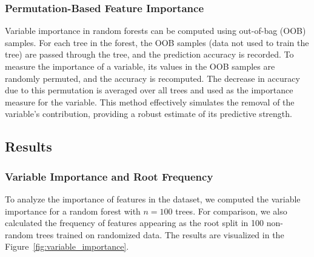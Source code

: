 \documentclass[fleqn,moreauthors,10pt]{ds_report}
\begin{document}
\subsubsection*{Permutation-Based Feature Importance}

Variable importance in random forests can be computed using out-of-bag (OOB) samples. For each tree in the forest, the OOB samples (data not used to train the tree) are passed through the tree, and the prediction accuracy is recorded. To measure the importance of a variable, its values in the OOB samples are randomly permuted, and the accuracy is recomputed. The decrease in accuracy due to this permutation is averaged over all trees and used as the importance measure for the variable. This method effectively simulates the removal of the variable's contribution, providing a robust estimate of its predictive strength\cite{ESL}.

\subsection*{Results}


\subsubsection*{Variable Importance and Root Frequency}

To analyze the importance of features in the dataset, we computed the variable importance for a random forest with \( n = 100 \) trees. For comparison, we also calculated the frequency of features appearing as the root split in 100 non-random trees trained on randomized data. The results are visualized in the Figure~\ref{fig:variable_importance}.
\end{document}

